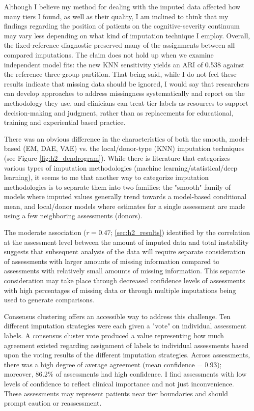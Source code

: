 Although I believe my method for dealing with the imputed data affected how many tiers I found, as well as their quality, I am inclined to think that my findings regarding the position of patients on the cognitive-severity continuum may vary less depending on what kind of imputation technique I employ. Overall, the fixed-reference diagnostic preserved many of the assignments between all compared imputations. The claim does not hold up when we examine independent model fits: the new KNN sensitivity yields an ARI of 0.538 against the reference three-group partition. That being said, while I do not feel these results indicate that missing data should be ignored, I would say that researchers can develop approaches to address missingness systematically and report on the methodology they use, and clinicians can treat tier labels as resources to support decision-making and judgment, rather than as replacements for educational, training and experiential based practice.

There was an obvious difference in the characteristics of both the smooth, model-based (EM, DAE, VAE) vs. the local/donor-type (KNN) imputation techniques (see Figure \ref{fig:h2_dendrogram}). While there is literature that categorizes various types of imputation methodologies (machine learning/statistical/deep learning), it seems to me that another way to categorize imputation methodologies is to separate them into two families: the "smooth" family of models where imputed values generally trend towards a model-based conditional mean, and local/donor models where estimates for a single assessment are made using a few neighboring assessments (donors).

The moderate association (\(r = 0.47\); \textsection{}\ref{sec:h2_results}) identified by the correlation at the assessment level between the amount of imputed data and total instability suggests that subsequent analysis of the data will require separate consideration of assessments with larger amounts of missing information compared to assessments with relatively small amounts of missing information. This separate consideration may take place through decreased confidence levels of assessments with high percentages of missing data or through multiple imputations being used to generate comparisons.

Consensus clustering offers an accessible way to address this challenge. Ten different imputation strategies were each given a "vote" on individual assessment labels. A consensus cluster vote produced a value representing how much agreement existed regarding assignment of labels to individual assessments based upon the voting results of the different imputation strategies. Across assessments, there was a high degree of average agreement (mean confidence = 0.93); moreover, 86.2\% of assessments had high confidence. I find assessments with low levels of confidence to reflect clinical importance and not just inconvenience. These assessments may represent patients near tier boundaries and should prompt caution or reassessment.

